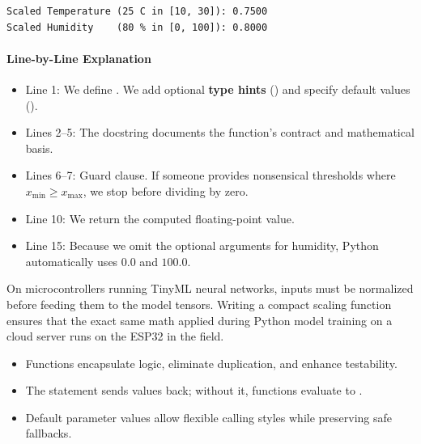 \begin{lstlisting}[style=outputstyle]
Scaled Temperature (25 C in [10, 30]): 0.7500
Scaled Humidity    (80 % in [0, 100]): 0.8000
\end{lstlisting}

\paragraph{Line-by-Line Explanation}
\begin{itemize}
    \item Line 1: We define . We add optional \textbf{type hints} () and specify default values ().
    \item Lines 2--5: The docstring documents the function's contract and mathematical basis.
    \item Lines 6--7: Guard clause. If someone provides nonsensical thresholds where $x_{\min} \ge x_{\max}$, we stop before dividing by zero.
    \item Line 10: We return the computed floating-point value.
    \item Line 15: Because we omit the optional arguments for humidity, Python automatically uses $0.0$ and $100.0$.
\end{itemize}

\begin{iotbox}
On microcontrollers running TinyML neural networks, inputs must be normalized before feeding them to the model tensors. Writing a compact scaling function ensures that the exact same math applied during Python model training on a cloud server runs on the ESP32 in the field.
\end{iotbox}

\begin{takeaways}
\begin{itemize}
    \item Functions encapsulate logic, eliminate duplication, and enhance testability.
    \item The  statement sends values back; without it, functions evaluate to .
    \item Default parameter values allow flexible calling styles while preserving safe fallbacks.
\end{itemize}
\end{takeaways}


